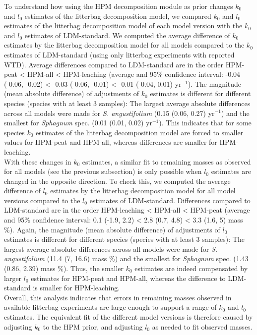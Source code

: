 \documentclass[esd, manuscript]{copernicus}
\begin{document}
To understand how using the HPM decomposition module as prior changes \(k_0\) and \(l_0\) estimates of the litterbag decomposition model, we compared \(k_0\) and \(l_0\) estimates of the litterbag decomposition model of each model version with the \(k_0\) and \(l_0\) estimates of LDM-standard. We computed the average difference of \(k_0\) estimates by the litterbag decomposition model for all models compared to the \(k_0\) estimates of LDM-standard (using only litterbag experiments with reported WTD). Average differences compared to LDM-standard are in the order HPM-peat \textless{} HPM-all \textless{} HPM-leaching (average and 95\% confidence interval: -0.04 (-0.06, -0.02) \textless{} -0.03 (-0.06, -0.01) \textless{} -0.01 (-0.04, 0.01) yr\(^{-1}\)). The magnitude (mean absolute difference) of adjustments of \(k_0\) estimates is different for different species (species with at least 3 samples): The largest average absolute differences across all models were made for \emph{S. angustifolium} (0.15 (0.06, 0.27) yr\(^{-1}\)) and the smallest for \emph{Sphagnum} spec. (0.01 (0.01, 0.02) yr\(^{-1}\)). This indicates that for some species \(k_0\) estimates of the litterbag decomposition model are forced to smaller values for HPM-peat and HPM-all, whereas differences are smaller for HPM-leaching.\\
With these changes in \(k_0\) estimates, a similar fit to remaining masses as observed for all models (see the previous subsection) is only possible when \(l_0\) estimates are changed in the opposite direction. To check this, we computed the average difference of \(l_0\) estimates by the litterbag decomposition model for all model versions compared to the \(l_0\) estimates of LDM-standard. Differences compared to LDM-standard are in the order HPM-leaching \textless{} HPM-all \textless{} HPM-peat (average and 95\% confidence interval: 0.1 (-1.9, 2.2) \textless{} 2.8 (0.7, 4.8) \textless{} 3.3 (1.6, 5) mass \%). Again, the magnitude (mean absolute difference) of adjustments of \(l_0\) estimates is different for different species (species with at least 3 samples): The largest average absolute differences across all models were made for \emph{S. angustifolium} (11.4 (7, 16.6) mass \%) and the smallest for \emph{Sphagnum} spec. (1.43 (0.86, 2.39) mass \%). Thus, the smaller \(k_0\) estimates are indeed compensated by larger \(l_0\) estimates for HPM-peat and HPM-all, whereas the difference to LDM-standard is smaller for HPM-leaching.\\
Overall, this analysis indicates that errors in remaining masses observed in available litterbag experiments are large enough to support a range of \(k_0\) and \(l_0\) estimates. The equivalent fit of the different model versions is therefore caused by adjusting \(k_0\) to the HPM prior, and adjusting \(l_0\) as needed to fit observed masses.
\end{document}
